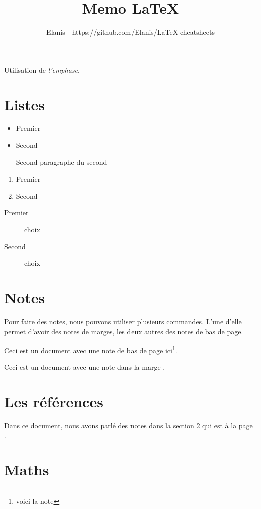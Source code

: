 \documentclass[a4paper, 12pt, french]{article}
\title{Memo LaTeX}
\author{Elanis - https://github.com/Elanis/LaTeX-cheatsheets}
\begin{document}
	\maketitle

	Utilisation de \emph{l'emphase}.

	\section{Listes}

	\begin{itemize}
		\item Premier
		\item Second

		Second paragraphe du second
	\end{itemize}

	\begin{enumerate}
		\item Premier
		\item Second
	\end{enumerate}

	\begin{description}
		\item[Premier] choix
		\item[Second] choix
	\end{description}

	\section{Notes}
	\label{sec:notes}

	Pour faire des notes, nous pouvons utiliser plusieurs commandes. L’une d’elle permet 
	d’avoir des notes de marges, les deux autres des notes de bas de page.

	Ceci est un document avec une note de bas de page ici\footnote{voici la note}.

	Ceci est un document avec une note dans la marge .

	\section{Les références}
	Dans ce document, nous avons parlé des notes dans la section \ref{sec:notes} qui est à 
	la page \pageref{sec:notes}.

	\section{Maths}
\end{document}
